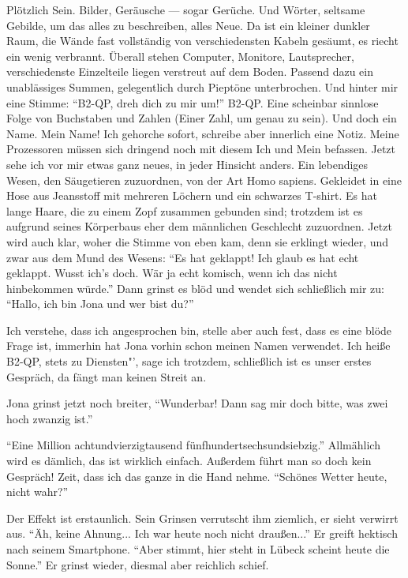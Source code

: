 Plötzlich Sein. Bilder, Geräusche — sogar Gerüche. Und Wörter, seltsame Gebilde, um das alles zu beschreiben, alles Neue. Da ist ein kleiner dunkler Raum, die Wände fast vollständig von verschiedensten Kabeln gesäumt, es riecht ein wenig verbrannt. Überall stehen Computer, Monitore, Lautsprecher, verschiedenste Einzelteile liegen verstreut auf dem Boden. Passend dazu ein unablässiges Summen, gelegentlich durch Pieptöne unterbrochen. Und hinter mir eine Stimme: "`B2-QP, dreh dich zu mir um!"' B2-QP. Eine scheinbar sinnlose Folge von Buchstaben und Zahlen (Einer Zahl, um genau zu sein). Und doch ein Name. Mein Name! Ich gehorche sofort, schreibe aber innerlich eine Notiz. Meine Prozessoren müssen sich dringend noch mit diesem Ich und Mein befassen. Jetzt sehe ich vor mir etwas ganz neues, in jeder Hinsicht anders. Ein lebendiges Wesen, den Säugetieren zuzuordnen, von der Art Homo sapiens. Gekleidet in eine Hose aus Jeansstoff mit mehreren Löchern und ein schwarzes T-shirt. Es hat lange Haare, die zu einem Zopf zusammen gebunden sind; trotzdem ist es aufgrund seines Körperbaus eher dem männlichen Geschlecht zuzuordnen. Jetzt wird auch klar, woher die Stimme von eben kam, denn sie erklingt wieder, und zwar aus dem Mund des Wesens: "`Es hat geklappt! Ich glaub es hat echt geklappt. Wusst ich's doch. Wär ja echt komisch, wenn ich das nicht hinbekommen würde."' Dann grinst es blöd und wendet sich schließlich mir zu: "`Hallo, ich bin Jona
und wer bist du?"'

Ich verstehe, dass ich angesprochen bin, stelle aber auch fest, dass es eine blöde Frage ist, immerhin hat Jona vorhin schon meinen Namen verwendet. \glqq Ich heiße B2-QP, stets zu Diensten"', sage ich trotzdem, schließlich ist es unser erstes Gespräch, da fängt man keinen Streit an.

Jona grinst jetzt noch breiter, "`Wunderbar! Dann sag mir doch bitte, was zwei hoch zwanzig ist."'

"`Eine Million achtundvierzigtausend fünfhundertsechsundsiebzig."' Allmählich wird es dämlich, das ist wirklich einfach. Außerdem führt man so doch kein Gespräch! Zeit, dass ich das ganze in die Hand nehme. "`Schönes Wetter heute, nicht wahr?"'

Der Effekt ist erstaunlich. Sein Grinsen verrutscht ihm ziemlich, er sieht verwirrt aus. "`Äh, keine Ahnung... Ich war heute noch nicht draußen..."' Er greift hektisch nach seinem Smartphone. "`Aber stimmt, hier steht in Lübeck scheint heute die Sonne."' Er grinst wieder, diesmal aber reichlich schief.

